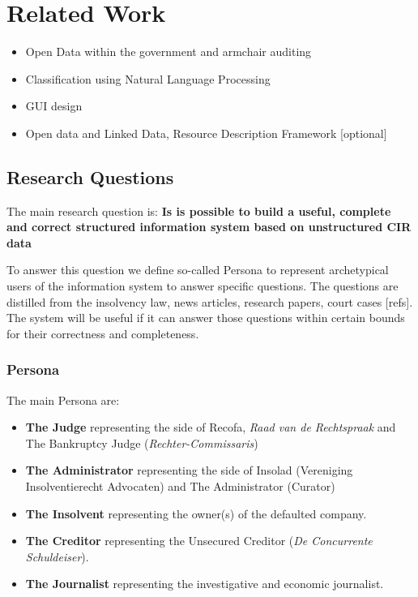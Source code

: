 \section{Related Work}
\begin{itemize}
	\item Open Data within the government and armchair auditing
	\item Classification using Natural Language Processing
	\item GUI design
	\item Open data and Linked Data, Resource Description Framework [optional]
\end{itemize}

\subsection{Research Questions}

The main research question is:
\textbf{Is is possible to build a useful, complete and correct structured information system based on unstructured CIR data}

To answer this question we define so-called Persona to represent archetypical users of the information system to answer specific questions. The questions are distilled from the insolvency law, news articles, research papers, court cases [refs]. The system will be useful if it can answer those questions within certain bounds for their correctness and completeness. 

\subsubsection{Persona}


The main Persona are: 
\begin{itemize}
\item \textbf{The Judge} representing the side of Recofa, \textit{Raad van de Rechtspraak} and The Bankruptcy Judge (\textit{Rechter-Commissaris})
\item \textbf{The Administrator} representing the side of Insolad (Vereniging Insolventierecht Advocaten) and The Administrator (Curator) 
\item \textbf{The Insolvent} representing the owner(s) of the defaulted company.
\item \textbf{The Creditor} representing the Unsecured Creditor (\textit{De Concurrente Schuldeiser}).
\item \textbf{The Journalist} representing the investigative and economic journalist.
\end{itemize}

